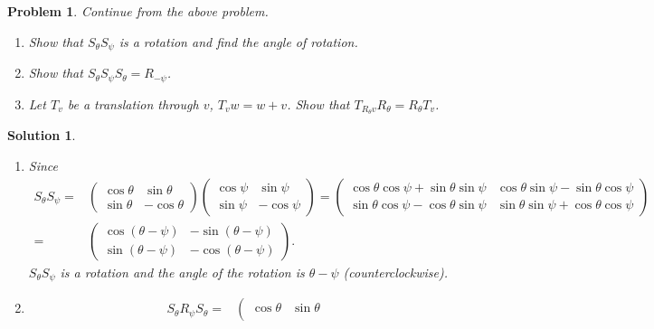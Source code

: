 \documentclass[UTF8,10pt,a4paper]{article}
\theoremstyle{Problem}
\newtheorem{prob}{Problem}
\theoremstyle{Solution}
\newtheorem*{sol}{Solution}
\begin{document}
\begin{prob}
    Continue from the above problem.
    \begin{enumerate}
        \item[(a)] Show that $S_{\theta}S_{\psi}$ is a rotation and find the angle of rotation.
        \item[(b)] Show that $S_{\theta}S_{\psi}S_{\theta}=R_{-\psi}$.
        \item[(c)] Let $T_v$ be a translation through $v$, $T_vw=w+v$. Show that $T_{R_{\theta}v}R_{\theta}=R_{\theta}T_v$.
    \end{enumerate}
\end{prob}
\begin{sol}
    \begin{enumerate}
        \item[(a)] Since
        \begin{align}
            \nonumber S_{\theta}S_{\psi}=&\left(\begin{matrix}
                \cos\theta&\sin\theta\\
                \sin\theta&-\cos\theta
            \end{matrix}\right)\left(\begin{matrix}
                \cos\psi&\sin\psi\\
                \sin\psi&-\cos\psi
            \end{matrix}\right)=\left(\begin{matrix}
                \cos\theta\cos\psi+\sin\theta\sin\psi&\cos\theta\sin\psi-\sin\theta\cos\psi\\
                \sin\theta\cos\psi-\cos\theta\sin\psi&\sin\theta\sin\psi+\cos\theta\cos\psi
            \end{matrix}\right)\\
            \nonumber=&\left(\begin{matrix}
                \cos(\theta-\psi)&-\sin(\theta-\psi)\\
                \sin(\theta-\psi)&-\cos(\theta-\psi)
            \end{matrix}\right).
        \end{align}
        $S_{\theta}S_{\psi}$ is a rotation and the angle of the rotation is $\theta-\psi$ (counterclockwise).
        \item[(b)]
        \begin{align}
            \nonumber S_{\theta}R_{\psi}S_{\theta}=&\left(\begin{matrix}
                \cos\theta&\sin\theta\\

\end{matrix}
\end{align}
\end{enumerate}
\end{sol}
\end{document}
